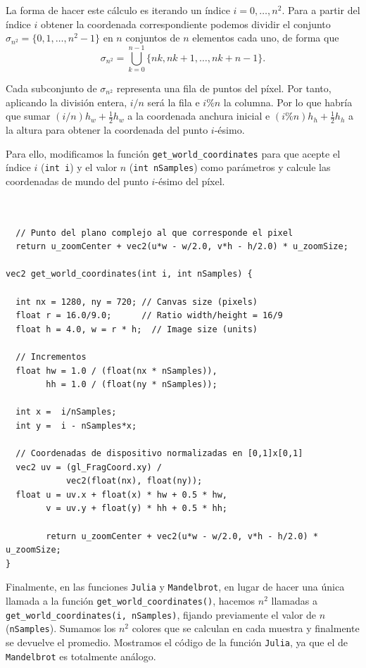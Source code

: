 La forma de hacer este cálculo es iterando un índice $i=0,\dots,n^2$. Para a partir del índice $i$ obtener la coordenada correspondiente podemos dividir el conjunto $\sigma_{n^2}=\{0,1,\dots,n^2-1\}$ en $n$ conjuntos de $n$ elementos cada uno, de forma que
$$
\sigma_{n^2} = \bigcup_{k=0}^{n-1} \{nk, nk+1, \dots, nk+n-1\}.
$$

Cada subconjunto de $\sigma_{n^2}$ representa una fila de puntos del píxel. Por tanto, aplicando la división entera, $i/n$ será la fila e $i\%n$ la columna. Por lo que habría que sumar $(i/n)h_w + \frac{1}{2}h_w$ a la coordenada anchura inicial e $(i\%n)h_h+ \frac{1}{2}h_h$ a la altura para obtener la coordenada del punto $i$-ésimo.

Para ello, modificamos la función \verb|get_world_coordinates| para que acepte el índice $i$ (\verb|int i|) y el valor $n$ (\verb|int nSamples|) como parámetros y calcule las coordenadas de mundo del punto $i$-ésimo del píxel.

\begin{lstlisting}

  
  // Punto del plano complejo al que corresponde el pixel
  return u_zoomCenter + vec2(u*w - w/2.0, v*h - h/2.0) * u_zoomSize;

vec2 get_world_coordinates(int i, int nSamples) {

  int nx = 1280, ny = 720; // Canvas size (pixels)
  float r = 16.0/9.0;      // Ratio width/height = 16/9
  float h = 4.0, w = r * h;  // Image size (units) 

  // Incrementos
  float hw = 1.0 / (float(nx * nSamples)),
        hh = 1.0 / (float(ny * nSamples));

  int x =  i/nSamples;
  int y =  i - nSamples*x;

  // Coordenadas de dispositivo normalizadas en [0,1]x[0,1]
  vec2 uv = (gl_FragCoord.xy) / 
            vec2(float(nx), float(ny));
  float u = uv.x + float(x) * hw + 0.5 * hw,
        v = uv.y + float(y) * hh + 0.5 * hh;
  
        return u_zoomCenter + vec2(u*w - w/2.0, v*h - h/2.0) * u_zoomSize;
}
\end{lstlisting}

Finalmente, en las funciones \verb|Julia| y \verb|Mandelbrot|, en lugar de hacer una única llamada a la función \texttt{get\_world\_coordinates()}, hacemos $n^2$ llamadas a \texttt{get\_world\_coordinates(i, nSamples)}, fijando previamente el valor de $n$ (\verb|nSamples|). Sumamos los $n^2$ colores que se calculan en cada muestra y finalmente se devuelve el promedio. Mostramos el código de la función \verb|Julia|, ya que el de \verb|Mandelbrot| es totalmente análogo.

